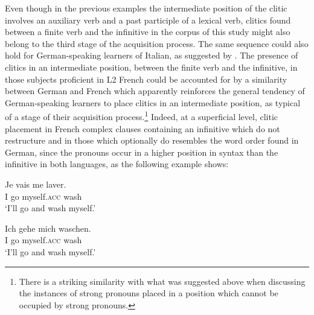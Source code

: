 \documentclass[output=paper,modfonts,nonflat,newtxmath]{langsci/langscibook}
\begin{document}
Even though in the previous examples the intermediate position of the clitic involves an auxiliary verb and a past participle of a lexical verb, clitics found between a finite verb and the infinitive in the corpus of this study might also belong to the third stage of the acquisition process. The same sequence could also hold for German-speaking learners of Italian, as suggested by \citet{HamannBelletti2006}. The presence of clitics in an intermediate position, between the finite verb and the infinitive, in those subjects proficient in L2 French could be accounted for by a similarity between German and French which apparently reinforces the general tendency of German-speaking learners to place clitics in an intermediate position, as typical of a stage of their acquisition process.\footnote{There is a striking similarity with what was suggested above when discussing the instances of strong pronouns placed in a position which cannot be occupied by strong pronouns.} Indeed, at a superficial level, clitic placement in French complex clauses containing an infinitive which do not restructure and in those which optionally do resembles the word order found in German, since the pronouns occur in a higher position in syntax than the infinitive in both languages, as the following example shows:

\ea \label{ex:sciutti:45}
\begin{xlist}
    \ex \label{ex:sciutti:45a}
    \gll Je vais me laver.\\
        I go myself.\textsc{acc} wash\\
    \glt  ‘I’ll go and wash myself.’

    \ex \label{ex:sciutti:45b}
    \gll Ich gehe mich waschen.\\
        I go myself.\textsc{acc} wash\\
    \glt ‘I’ll go and wash myself.’
\end{xlist}
\z
\end{document}
